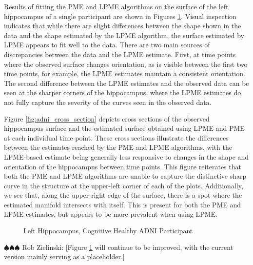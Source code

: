 \documentclass[11pt,reqno]{article}
\newcommand{\zielinski}[1]{{\color{blue} \sf $\spadesuit\spadesuit\spadesuit$ Rob Zielinski: [#1]}}
\theoremstyle{definition}
\begin{document}
Results of fitting the PME and LPME algorithms on the surface of the left hippocampus of a single participant are shown in Figures \ref{fig:adni_result}. Visual inspection indicates that while there are slight differences between the shape shown in the data and the shape estimated by the LPME algorithm, the surface estimated by LPME appears to fit well to the data. There are two main sources of discrepancies between the data and the LPME estimate. First, at time points where the observed surface changes orientation, as is visible between the first two time points, for example, the LPME estimates maintain a consistent orientation. The second difference between the LPME estimates and the observed data can be seen at the sharper corners of the hippocampus, where the LPME estimates do not fully capture the severity of the curves seen in the observed data.

Figure \ref{fig:adni_cross_section} depicts cross sections of the observed hippocampus surface and the estimated surface obtained using LPME and PME at each individual time point. These cross sections illustrate the differences between the estimates reached by the PME and LPME algorithms, with the LPME-based estimate being generally less responsive to changes in the shape and orientation of the hippocampus between time points. This figure reiterates that both the PME and LPME algorithms are unable to capture the distinctive sharp curve in the structure at the upper-left corner of each of the plots. Additionally, we see that, along the upper-right edge of the surface, there is a spot where the estimated manifold intersects with itself. This is present for both the PME and LPME estimates, but appears to be more prevalent when using LPME.

\begin{figure}%
  \centering
  \hfill
  \hfill

  \caption{Left Hippocampus, Cognitive Healthy ADNI Participant}
  \label{fig:adni_result}
\end{figure}



\zielinski{Figure \ref{fig:adni_result} will continue to be improved, with the current version mainly serving as a placeholder.}
\end{document}
